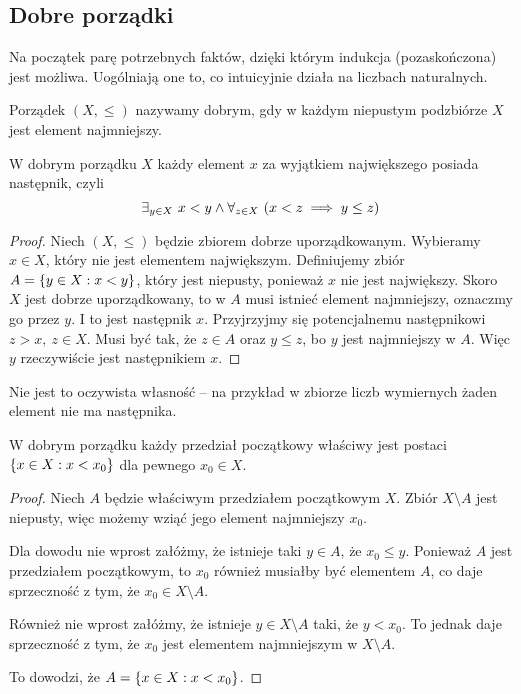 \subsection{Dobre porządki}
Na początek parę potrzebnych faktów, dzięki którym indukcja (pozaskończona) jest możliwa. Uogólniają one to, co intuicyjnie działa na liczbach naturalnych.

\begin{definition}
    Porządek \( (X, \leq) \) nazywamy dobrym, gdy w każdym niepustym podzbiórze \( X \) jest element najmniejszy.
\end{definition}

\begin{theorem}
    W dobrym porządku \( X \) każdy element \( x \) za wyjątkiem największego posiada następnik, czyli
    \[
        \exists_{y \in X} \ x < y \land \forall_{z \in X} \ \pars{x < z \implies y \leq z}
    \]
\end{theorem}
\begin{proof}
    Niech \( (X, \leq) \) będzie zbiorem dobrze uporządkowanym. Wybieramy \( x \in X \), który nie jest elementem największym.
    Definiujemy zbiór \( A = \set{y \in X : x < y} \), który jest niepusty, ponieważ \( x \) nie jest największy. Skoro \( X \) jest dobrze uporządkowany, to w \( A \) musi istnieć element najmniejszy, oznaczmy go przez \( y \).
    I to jest następnik \( x \). Przyjrzyjmy się potencjalnemu następnikowi \( z > x, \ z \in X \). Musi być tak, że \( z \in A \) oraz \( y \leq z \), bo \( y \) jest najmniejszy w \( A \).
    Więc \( y \) rzeczywiście jest następnikiem \( x \).
\end{proof}
Nie jest to oczywista własność -- na przykład w zbiorze liczb wymiernych żaden element nie ma następnika.

\begin{theorem}
    W dobrym porządku każdy przedział początkowy właściwy jest postaci \( \set{x \in X : x < x_0} \) dla pewnego \( x_0 \in X \).
\end{theorem}
\begin{proof}
    Niech \( A \) będzie właściwym przedziałem początkowym \( X \). Zbiór \( X \setminus A \) jest niepusty, więc możemy wziąć jego element najmniejszy \( x_0 \).

    Dla dowodu nie wprost załóżmy, że istnieje taki \( y \in A \), że \( x_0 \leq y \). Ponieważ \( A \) jest przedziałem początkowym, to \( x_0 \) również musiałby być elementem \( A \), co daje sprzeczność z tym, że \( x_0 \in X \setminus A \).

    Również nie wprost załóżmy, że istnieje \( y \in X \setminus A \) taki, że \( y < x_0 \). To jednak daje sprzeczność z tym, że \( x_0 \) jest elementem najmniejszym w \( X \setminus A \).

    To dowodzi, że \( A = \set{x \in X : x < x_0} \).
\end{proof}
